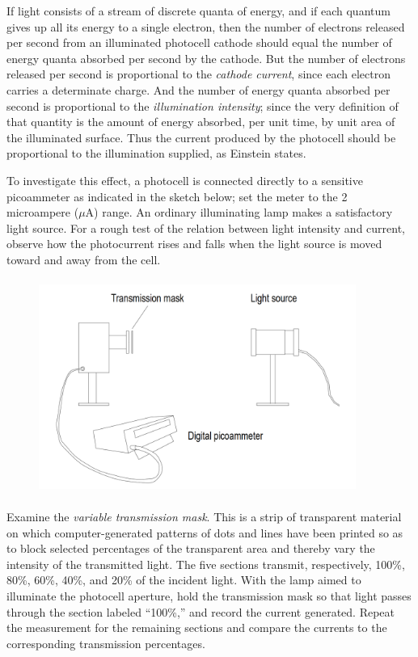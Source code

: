 If light consists of a stream of discrete quanta of energy, and if each
quantum gives up all its energy to a single electron, then the number of
electrons released per second from an illuminated photocell cathode
should equal the number of energy quanta absorbed per second by the
cathode. But the number of electrons released per second is proportional
to the \emph{cathode current}, since each electron carries a determinate
charge. And the number of energy quanta absorbed per second is
proportional to the \emph{illumination intensity}; since the very
definition of that quantity is the amount of energy absorbed, per unit
time, by unit area of the illuminated surface. Thus the current produced
by the photocell should be proportional to the illumination supplied, as
Einstein states.

To investigate this effect, a photocell is connected directly to a
sensitive picoammeter as indicated in the sketch below; set the meter to
the 2 microampere ($\mu\text{A}$) range. An ordinary
illuminating lamp makes a satisfactory light source. For a rough test of
the relation between light intensity and current, observe how the
photocurrent rises and falls when the light source is moved toward and
away from the cell.

\begin{figure}[h]
  \begin{center}
  \includegraphics[width=4.08333in,height=2.77083in]{images/06_einstein/001.png}
  \end{center}
\end{figure}

Examine the \emph{variable transmission mask}. This is a strip of
transparent material on which computer-generated patterns of dots and
lines have been printed so as to block selected percentages of the
transparent area and thereby vary the intensity of the transmitted
light. The five sections transmit, respectively, 100\%, 80\%, 60\%,
40\%, and 20\% of the incident light. With the lamp aimed to illuminate
the photocell aperture, hold the transmission mask so that light passes
through the section labeled ``100\%,'' and record the current generated.
Repeat the measurement for the remaining sections and compare the
currents to the corresponding transmission percentages.

